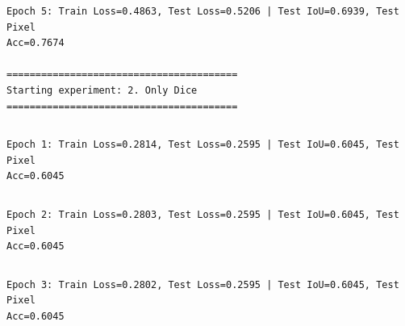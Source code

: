 \documentclass[11pt]{article}
\begin{document}
    \begin{Verbatim}[commandchars=\\\{\}]

    \end{Verbatim}

    \begin{Verbatim}[commandchars=\\\{\}]
Epoch 5: Train Loss=0.4863, Test Loss=0.5206 | Test IoU=0.6939, Test Pixel
Acc=0.7674

========================================
Starting experiment: 2. Only Dice
========================================
    \end{Verbatim}

    \begin{Verbatim}[commandchars=\\\{\}]

    \end{Verbatim}

    \begin{Verbatim}[commandchars=\\\{\}]
Epoch 1: Train Loss=0.2814, Test Loss=0.2595 | Test IoU=0.6045, Test Pixel
Acc=0.6045
    \end{Verbatim}

    \begin{Verbatim}[commandchars=\\\{\}]

    \end{Verbatim}

    \begin{Verbatim}[commandchars=\\\{\}]
Epoch 2: Train Loss=0.2803, Test Loss=0.2595 | Test IoU=0.6045, Test Pixel
Acc=0.6045
    \end{Verbatim}

    \begin{Verbatim}[commandchars=\\\{\}]

    \end{Verbatim}

    \begin{Verbatim}[commandchars=\\\{\}]
Epoch 3: Train Loss=0.2802, Test Loss=0.2595 | Test IoU=0.6045, Test Pixel
Acc=0.6045
    \end{Verbatim}

    \begin{Verbatim}[commandchars=\\\{\}]

    \end{Verbatim}
\end{document}
